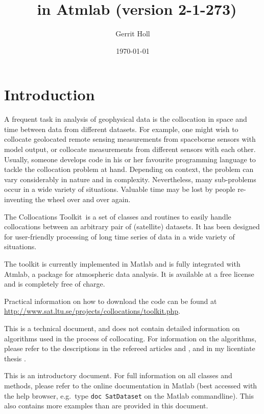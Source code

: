 \documentclass[a4paper,10pt]{article}
\title{\collocs\ in Atmlab (version 2-1-273)}
\date{\isodate\today}
\author{Gerrit Holl}
\newcommand{\collocs}{Collocations Toolkit}
\begin{document}
\maketitle
\tableofcontents
\listoffigures
\listoftables
{}

\section{Introduction}

A frequent task in analysis of geophysical data is the collocation in space
and time between data from different datasets.
For example, one might wish to collocate geolocated remote sensing measurements from
spaceborne sensors with model output, or collocate measurements from different
sensors with each other.
Usually, someone develops code in his or her favourite programming language
to tackle the collocation problem at hand.
Depending on context, the problem can vary considerably in nature and in
complexity.
Nevertheless, many sub-problems occur in a wide variety of situations.
Valuable time may be lost by people re-inventing the wheel over and over
again.

The \collocs\ is a set of classes and routines to easily
handle collocations between an arbitrary pair of (satellite) datasets.
It has been designed for user-friendly processing of long time series of data in a
wide variety of situations.

The toolkit is currently implemented in Matlab and is fully integrated with
Atmlab, a package for atmospheric data analysis.
It is available at a free license and is completely free of charge.

Practical information on how to download the code can be found at
\url{http://www.sat.ltu.se/projects/collocations/toolkit.php}.

This is a technical document, and does not contain detailed information on
algorithms used in the process of collocating.
For information on the algorithms, please refer to the descriptions in the
refereed articles \citet{holl10:_collocating_amt} and
\citet{john12:_understanding_jgr}, and in my licentiate thesis
\citep{holl11:_lic}.

This is an introductory document.
For full information on all classes and methods, please refer to the online
documentation in Matlab (best accessed with the help browser, e.g.\
type \lstinline!doc SatDataset! on the Matlab commandline).
This also contains more examples than are provided in this document.
\end{document}
